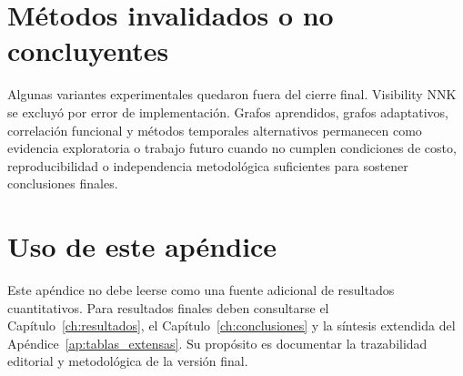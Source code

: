 \section{Métodos invalidados o no concluyentes}

Algunas variantes experimentales quedaron fuera del cierre final. Visibility NNK se excluyó por error de implementación. Grafos aprendidos, grafos adaptativos, correlación funcional y métodos temporales alternativos permanecen como evidencia exploratoria o trabajo futuro cuando no cumplen condiciones de costo, reproducibilidad o independencia metodológica suficientes para sostener conclusiones finales.

\section{Uso de este apéndice}

Este apéndice no debe leerse como una fuente adicional de resultados cuantitativos. Para resultados finales deben consultarse el Capítulo~\ref{ch:resultados}, el Capítulo~\ref{ch:conclusiones} y la síntesis extendida del Apéndice~\ref{ap:tablas_extensas}. Su propósito es documentar la trazabilidad editorial y metodológica de la versión final.
